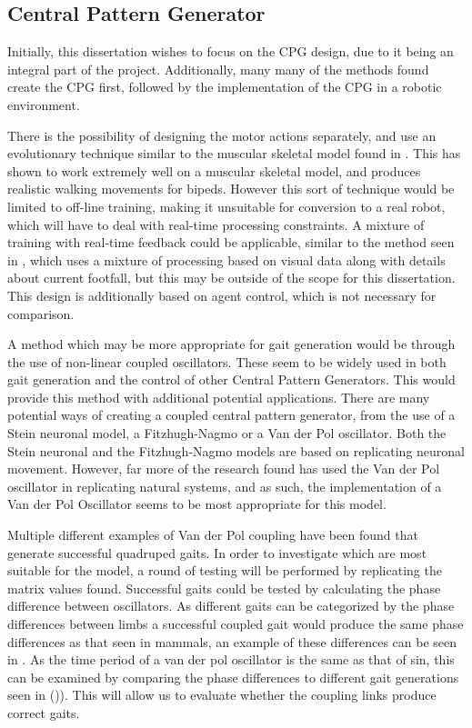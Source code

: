 \subsection{Central Pattern Generator}
Initially, this dissertation wishes to focus on the CPG design, due to it being an integral part of the project. Additionally, many many of the methods found create the CPG first, followed by the implementation of the CPG in a robotic environment. 

There is the possibility of designing the motor actions separately, and use an evolutionary technique similar to the muscular skeletal model found in \cite{}. This has shown to work extremely well on a muscular skeletal model, and produces realistic walking movements for bipeds. However this sort of technique would be limited to off-line training, making it unsuitable for conversion to a real robot, which will have to deal with real-time processing constraints. A mixture of training with real-time feedback could be applicable, similar to the method seen in \cite{Zhang2018}, which uses a mixture of processing based on visual data along with details about current footfall, but this may be outside of the scope for this dissertation. This design is additionally based on agent control, which is not necessary for comparison.

A method which may be more appropriate for gait generation would be through the use of non-linear coupled oscillators. These seem to be widely used in both gait generation and the control of other Central Pattern Generators. This would provide this method with additional potential applications. There are many potential ways of creating a coupled central pattern generator, from the use of a Stein neuronal model, a Fitzhugh-Nagmo or a Van der Pol oscillator. Both the Stein neuronal and the Fitzhugh-Nagmo models are based on replicating neuronal movement. However, far more of the research found has used the Van der Pol oscillator in replicating natural systems, and as such, the implementation of a Van der Pol Oscillator seems to be most appropriate for this model.

Multiple different examples of Van der Pol coupling have been found that generate successful quadruped gaits. In order to investigate which are most suitable for the model, a round of testing will be performed by replicating the matrix values found. Successful gaits could be tested by calculating the phase difference between oscillators. As different gaits can be categorized by the phase differences between limbs a successful coupled gait would produce the same phase differences as that seen in mammals, an example of these differences can be seen in . As the time period of a van der pol oscillator is the same as that of sin, this can be examined by comparing the phase differences to different gait generations seen in ()). This will allow us to evaluate whether the coupling links produce correct gaits.


